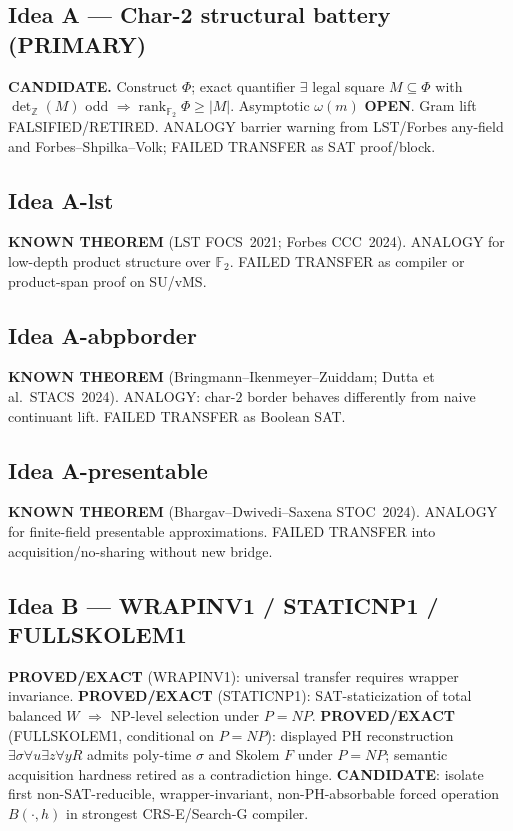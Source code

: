 \documentclass[11pt]{article}
\begin{document}
\subsection*{Idea A --- Char-2 structural battery (PRIMARY)}
\textbf{CANDIDATE.} Construct $\Phi$; exact quantifier
$\exists$ legal square $M\subseteq\Phi$ with $\det_{\mathbb Z}(M)$ odd
$\Rightarrow\operatorname{rank}_{\mathbb F_2}\Phi\ge|M|$. Asymptotic $\omega(m)$
\textbf{OPEN}. Gram lift FALSIFIED/RETIRED. ANALOGY barrier warning from LST/Forbes any-field
and Forbes--Shpilka--Volk; FAILED TRANSFER as SAT proof/block.

\subsection*{Idea A-lst}
\textbf{KNOWN THEOREM} (LST FOCS~2021; Forbes CCC~2024). ANALOGY for low-depth product
structure over $\mathbb F_2$. FAILED TRANSFER as compiler or product-span proof on SU/vMS.

\subsection*{Idea A-abpborder}
\textbf{KNOWN THEOREM} (Bringmann--Ikenmeyer--Zuiddam; Dutta et al.\ STACS~2024). ANALOGY:
char-$2$ border behaves differently from naive continuant lift. FAILED TRANSFER as Boolean SAT.

\subsection*{Idea A-presentable}
\textbf{KNOWN THEOREM} (Bhargav--Dwivedi--Saxena STOC~2024). ANALOGY for finite-field
presentable approximations. FAILED TRANSFER into acquisition/no-sharing without new bridge.

\subsection*{Idea B --- WRAPINV1 / STATICNP1 / FULLSKOLEM1}
\textbf{PROVED/EXACT} (WRAPINV1): universal transfer requires wrapper invariance.
\textbf{PROVED/EXACT} (STATICNP1): SAT-staticization of total balanced $W$ $\Rightarrow$ NP-level
selection under $P=NP$.
\textbf{PROVED/EXACT} (FULLSKOLEM1, conditional on $P=NP$): displayed PH reconstruction
$\exists\sigma\forall u\exists z\forall y R$ admits poly-time $\sigma$ and Skolem $F$ under $P=NP$;
semantic acquisition hardness retired as a contradiction hinge.
\textbf{CANDIDATE}: isolate first non-SAT-reducible, wrapper-invariant, non-PH-absorbable
forced operation $B(\cdot,h)$ in strongest CRS-E/Search-G compiler.
\end{document}
